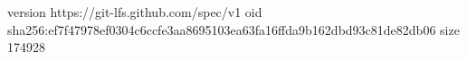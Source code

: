 version https://git-lfs.github.com/spec/v1
oid sha256:ef7f47978ef0304c6ccfe3aa8695103ea63fa16ffda9b162dbd93c81de82db06
size 174928
